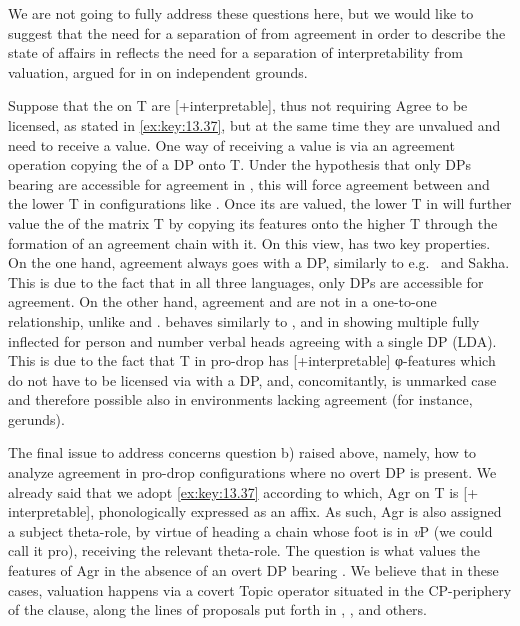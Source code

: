 \documentclass[output=paper]{langsci/langscibook}
\begin{document}
\begin{exe}
We are not going to fully address these questions here, but we would like to
suggest that the need for a separation of  from agreement in order
to describe the state of affairs in  reflects the need for a
separation of interpretability from valuation, argued for in
\citet{PesetskyTorrego2007} on independent grounds.

Suppose that the  on T are [+interpretable], thus not requiring
Agree to be licensed, as stated in \eqref{ex:key:13.37}, but at the same time
they are unvalued and need to receive a value. One way of receiving a value is
via an agreement operation copying the  of a DP onto T. Under the
hypothesis that only DPs bearing \Nom{} are accessible for agreement in ,
this will force agreement between \Nom{} and the lower T in configurations like
. Once its  are valued, the lower T in 
will further value the  of the matrix T by copying its features
onto the higher T through the formation of an agreement chain with it. On this
view,  has two key properties. On the one hand, agreement always goes with
a \Nom{} DP, similarly to e.g.\  and Sakha. This is due to the
fact that in all three languages, only \Nom{} DPs are accessible for agreement.
On the other hand, agreement and \Nom{} are not in a one-to-one relationship,
unlike  and .  behaves similarly to
,  and  in showing multiple fully inflected
for person and number verbal heads agreeing with a single \Nom{} DP
(\gls{LDA}). This is due to the fact that T in pro-drop
 has [+interpretable] φ-features which do not have to be licensed
via  with a \Nom{} DP, and, concomitantly, \Nom{} is unmarked case
and therefore possible also in environments lacking agreement (for instance,
gerunds).

The final issue to address concerns question b) raised above, namely, how to
analyze agreement in pro-drop configurations where no overt DP is present. We
already said that we adopt \eqref{ex:key:13.37} according to which, Agr on T is
[+ interpretable], phonologically expressed as an affix. As such, Agr is also
assigned a subject theta-role, by virtue of heading a chain whose foot is in
\emph{v}P (we could call it pro), receiving the relevant theta-role. The
question is what values the features of Agr in the absence of an overt DP
bearing \Nom{}. We believe that in these cases, valuation happens via a covert
Topic operator situated in the CP-periphery of the clause, along the lines of
proposals put forth in \citet{Frascarelli2007}, \citet{FraHin2007},
\citet{Miyagawa2017} and others.


\end{exe}
\end{document}
